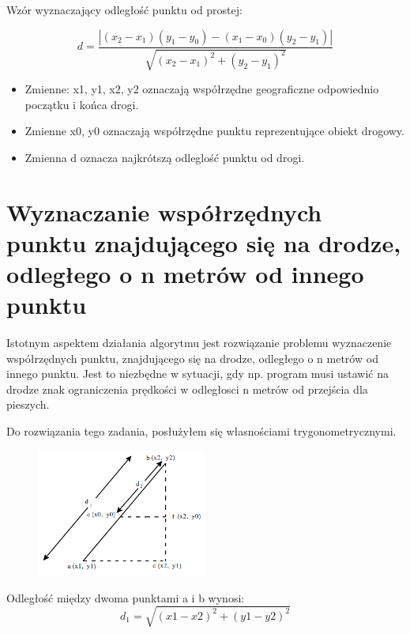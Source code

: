Wzór wyznaczający odległość punktu od prostej:

\begin{equation} \label{eq:distancePointLineal}
d = \frac{| (x_2 - x_1)(y_1 - y_0) - (x_1 - x_0)(y_2 - y_1) |}{\sqrt{(x_2 - x_1)^2 + (y_2 - y_1)^2}}
\end{equation}\newline

\begin{itemize}
\item Zmienne: x1, y1, x2, y2 oznaczają współrzędne geograficzne odpowiednio początku i końca drogi.
\item Zmienne x0, y0 oznaczają współrzędne punktu reprezentujące obiekt drogowy.
\item Zmienna d oznacza najkrótszą odleglość punktu od drogi.
\end{itemize}


\newpage
\section{Wyznaczanie współrzędnych punktu znajdującego się na drodze, odległego o n metrów od innego punktu}
\label{sec:pointCoordinatesFromAnotherPoint}

Istotnym aspektem działania algorytmu jest rozwiązanie problemu wyznaczenie współrzędnych punktu, znajdującego się na drodze, odległego o n metrów od innego punktu.  Jest to niezbędne w sytuacji, gdy np. program musi ustawić na drodze znak ograniczenia prędkości w odległosci n metrów od przejścia dla pieszych.

Do rozwiązania tego zadania, posłużyłem się własnościami trygonometrycznymi.


\begin{figure}[h]
\centering
\includegraphics[width=0.5\textwidth]{distance}
\end{figure}

Odległość między dwoma punktami a i b wynosi:
\begin{equation}
d_1 = \sqrt{(x1 - x2)^2 + (y1 - y2)^2}
\end{equation}\newline

